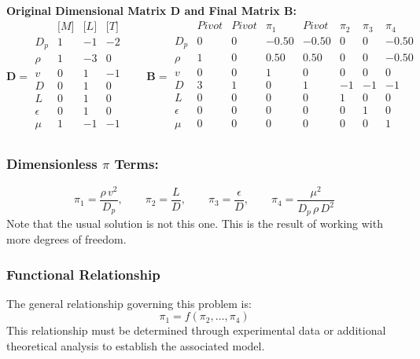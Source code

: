 \textbf{Original Dimensional Matrix $\mathbf{D}$ and Final Matrix $\mathbf{B}$:}
\begin{equation}\mathbf{D} = \begin{array}{r|rrr}
& \text{[}M\text{]} & \text{[}L\text{]} & \text{[}T\text{]} \\
\hline
D_p & 1 & -1 & -2 \\
\rho & 1 & -3 & 0 \\
v & 0 & 1 & -1 \\
D & 0 & 1 & 0 \\
L & 0 & 1 & 0 \\
\epsilon & 0 & 1 & 0 \\
\mu & 1 & -1 & -1 \\
\end{array}
\qquad
\mathbf{B} = \begin{array}{r|rrrrrrr}
& Pivot & Pivot & \pi_{1} & Pivot & \pi_{2} & \pi_{3} & \pi_{4} \\
\hline
D_p & 0 & 0 & -0.50 & -0.50 & 0 & 0 & -0.50 \\
\rho & 1 & 0 & 0.50 & 0.50 & 0 & 0 & -0.50 \\
v & 0 & 0 & 1 & 0 & 0 & 0 & 0 \\
D & 3 & 1 & 0 & 1 & -1 & -1 & -1 \\
L & 0 & 0 & 0 & 0 & 1 & 0 & 0 \\
\epsilon & 0 & 0 & 0 & 0 & 0 & 1 & 0 \\
\mu & 0 & 0 & 0 & 0 & 0 & 0 & 1 \\
\end{array}\end{equation}

\subsubsection*{Dimensionless $\pi$ Terms:}
\begin{equation}
\pi_{1} = \frac{\rho \, v^{2}}{D_p}, \qquad
\pi_{2} = \frac{L}{D}, \qquad
\pi_{3} = \frac{\epsilon}{D}, \qquad
\pi_{4} = \frac{\mu^{2}}{D_p \, \rho \, D^{2}}
\end{equation}
Note that the usual solution is not this one. This is the result of working with more degrees of freedom.

\subsubsection*{Functional Relationship}
The general relationship governing this problem is:
\begin{equation}
\pi_1 = f(\pi_2, \ldots, \pi_{4})
\end{equation}
This relationship must be determined through experimental data or additional theoretical analysis to establish the associated model.

